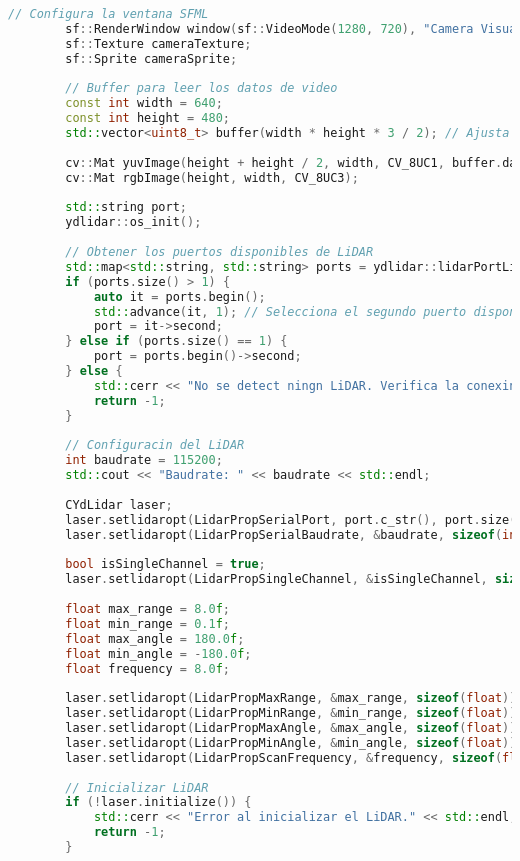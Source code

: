\begin{lstlisting}[language={C++}, caption={Primer ajuste de c\'odigo}, label={PrimerAjuste}]
        // Configura la ventana SFML
        sf::RenderWindow window(sf::VideoMode(1280, 720), "Camera Visualization with LiDAR");
        sf::Texture cameraTexture;
        sf::Sprite cameraSprite;
    
        // Buffer para leer los datos de video
        const int width = 640;
        const int height = 480;
        std::vector<uint8_t> buffer(width * height * 3 / 2); // Ajusta el tamao del buffer para YUV420
    
        cv::Mat yuvImage(height + height / 2, width, CV_8UC1, buffer.data());
        cv::Mat rgbImage(height, width, CV_8UC3);
    
        std::string port;
        ydlidar::os_init();
    
        // Obtener los puertos disponibles de LiDAR
        std::map<std::string, std::string> ports = ydlidar::lidarPortList();
        if (ports.size() > 1) {
            auto it = ports.begin();
            std::advance(it, 1); // Selecciona el segundo puerto disponible
            port = it->second;
        } else if (ports.size() == 1) {
            port = ports.begin()->second;
        } else {
            std::cerr << "No se detect ningn LiDAR. Verifica la conexin." << std::endl;
            return -1;
        }
    
        // Configuracin del LiDAR
        int baudrate = 115200;
        std::cout << "Baudrate: " << baudrate << std::endl;
    
        CYdLidar laser;
        laser.setlidaropt(LidarPropSerialPort, port.c_str(), port.size());
        laser.setlidaropt(LidarPropSerialBaudrate, &baudrate, sizeof(int));
    
        bool isSingleChannel = true;
        laser.setlidaropt(LidarPropSingleChannel, &isSingleChannel, sizeof(bool));
    
        float max_range = 8.0f;
        float min_range = 0.1f;
        float max_angle = 180.0f;
        float min_angle = -180.0f;
        float frequency = 8.0f;
    
        laser.setlidaropt(LidarPropMaxRange, &max_range, sizeof(float));
        laser.setlidaropt(LidarPropMinRange, &min_range, sizeof(float));
        laser.setlidaropt(LidarPropMaxAngle, &max_angle, sizeof(float));
        laser.setlidaropt(LidarPropMinAngle, &min_angle, sizeof(float));
        laser.setlidaropt(LidarPropScanFrequency, &frequency, sizeof(float));
    
        // Inicializar LiDAR
        if (!laser.initialize()) {
            std::cerr << "Error al inicializar el LiDAR." << std::endl;
            return -1;
        }
    

\end{lstlisting}
